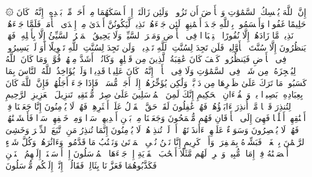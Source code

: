 \startbuffer[\q:35:41]
۞ إِنَّ ٱللَّهَ یُمۡسِكُ ٱلسَّمَٰوَٰتِ وَٱلۡأَرۡضَ أَن تَزُولَاۚ وَلَئِن زَالَتَاۤ إِنۡ أَمۡسَكَهُمَا مِنۡ أَحَدࣲ مِّنۢ بَعۡدِهِۦۤۚ إِنَّهُۥ كَانَ حَلِیمًا غَفُورࣰا%
\stopbuffer
\startbuffer[\q:35:42]
وَأَقۡسَمُوا۟ بِٱللَّهِ جَهۡدَ أَیۡمَٰنِهِمۡ لَئِن جَاۤءَهُمۡ نَذِیرࣱ لَّیَكُونُنَّ أَهۡدَىٰ مِنۡ إِحۡدَى ٱلۡأُمَمِۖ فَلَمَّا جَاۤءَهُمۡ نَذِیرࣱ مَّا زَادَهُمۡ إِلَّا نُفُورًا%
\stopbuffer
\startbuffer[\q:35:43]
ٱسۡتِكۡبَارࣰا فِی ٱلۡأَرۡضِ وَمَكۡرَ ٱلسَّیِّئِۚ وَلَا یَحِیقُ ٱلۡمَكۡرُ ٱلسَّیِّئُ إِلَّا بِأَهۡلِهِۦۚ فَهَلۡ یَنظُرُونَ إِلَّا سُنَّتَ ٱلۡأَوَّلِینَۚ فَلَن تَجِدَ لِسُنَّتِ ٱللَّهِ تَبۡدِیلࣰاۖ وَلَن تَجِدَ لِسُنَّتِ ٱللَّهِ تَحۡوِیلًا%
\stopbuffer
\startbuffer[\q:35:44]
أَوَ لَمۡ یَسِیرُوا۟ فِی ٱلۡأَرۡضِ فَیَنظُرُوا۟ كَیۡفَ كَانَ عَٰقِبَةُ ٱلَّذِینَ مِن قَبۡلِهِمۡ وَكَانُوۤا۟ أَشَدَّ مِنۡهُمۡ قُوَّةࣰۚ وَمَا كَانَ ٱللَّهُ لِیُعۡجِزَهُۥ مِن شَیۡءࣲ فِی ٱلسَّمَٰوَٰتِ وَلَا فِی ٱلۡأَرۡضِۚ إِنَّهُۥ كَانَ عَلِیمࣰا قَدِیرࣰا%
\stopbuffer
\startbuffer[\q:35:45]
وَلَوۡ یُؤَاخِذُ ٱللَّهُ ٱلنَّاسَ بِمَا كَسَبُوا۟ مَا تَرَكَ عَلَىٰ ظَهۡرِهَا مِن دَاۤبَّةࣲ وَلَٰكِن یُؤَخِّرُهُمۡ إِلَىٰۤ أَجَلࣲ مُّسَمࣰّىۖ فَإِذَا جَاۤءَ أَجَلُهُمۡ فَإِنَّ ٱللَّهَ كَانَ بِعِبَادِهِۦ بَصِیرَۢا%
\stopbuffer
\startbuffer[\q:36:1]
یسۤ%
\stopbuffer
\startbuffer[\q:36:2]
وَٱلۡقُرۡءَانِ ٱلۡحَكِیمِ%
\stopbuffer
\startbuffer[\q:36:3]
إِنَّكَ لَمِنَ ٱلۡمُرۡسَلِینَ%
\stopbuffer
\startbuffer[\q:36:4]
عَلَىٰ صِرَٰطࣲ مُّسۡتَقِیمࣲ%
\stopbuffer
\startbuffer[\q:36:5]
تَنزِیلَ ٱلۡعَزِیزِ ٱلرَّحِیمِ%
\stopbuffer
\startbuffer[\q:36:6]
لِتُنذِرَ قَوۡمࣰا مَّاۤ أُنذِرَ ءَابَاۤؤُهُمۡ فَهُمۡ غَٰفِلُونَ%
\stopbuffer
\startbuffer[\q:36:7]
لَقَدۡ حَقَّ ٱلۡقَوۡلُ عَلَىٰۤ أَكۡثَرِهِمۡ فَهُمۡ لَا یُؤۡمِنُونَ%
\stopbuffer
\startbuffer[\q:36:8]
إِنَّا جَعَلۡنَا فِیۤ أَعۡنَٰقِهِمۡ أَغۡلَٰلࣰا فَهِیَ إِلَى ٱلۡأَذۡقَانِ فَهُم مُّقۡمَحُونَ%
\stopbuffer
\startbuffer[\q:36:9]
وَجَعَلۡنَا مِنۢ بَیۡنِ أَیۡدِیهِمۡ سَدࣰّا وَمِنۡ خَلۡفِهِمۡ سَدࣰّا فَأَغۡشَیۡنَٰهُمۡ فَهُمۡ لَا یُبۡصِرُونَ%
\stopbuffer
\startbuffer[\q:36:10]
وَسَوَاۤءٌ عَلَیۡهِمۡ ءَأَنذَرۡتَهُمۡ أَمۡ لَمۡ تُنذِرۡهُمۡ لَا یُؤۡمِنُونَ%
\stopbuffer
\startbuffer[\q:36:11]
إِنَّمَا تُنذِرُ مَنِ ٱتَّبَعَ ٱلذِّكۡرَ وَخَشِیَ ٱلرَّحۡمَٰنَ بِٱلۡغَیۡبِۖ فَبَشِّرۡهُ بِمَغۡفِرَةࣲ وَأَجۡرࣲ كَرِیمٍ%
\stopbuffer
\startbuffer[\q:36:12]
إِنَّا نَحۡنُ نُحۡیِ ٱلۡمَوۡتَىٰ وَنَكۡتُبُ مَا قَدَّمُوا۟ وَءَاثَٰرَهُمۡۚ وَكُلَّ شَیۡءٍ أَحۡصَیۡنَٰهُ فِیۤ إِمَامࣲ مُّبِینࣲ%
\stopbuffer
\startbuffer[\q:36:13]
وَٱضۡرِبۡ لَهُم مَّثَلًا أَصۡحَٰبَ ٱلۡقَرۡیَةِ إِذۡ جَاۤءَهَا ٱلۡمُرۡسَلُونَ%
\stopbuffer
\startbuffer[\q:36:14]
إِذۡ أَرۡسَلۡنَاۤ إِلَیۡهِمُ ٱثۡنَیۡنِ فَكَذَّبُوهُمَا فَعَزَّزۡنَا بِثَالِثࣲ فَقَالُوۤا۟ إِنَّاۤ إِلَیۡكُم مُّرۡسَلُونَ%
